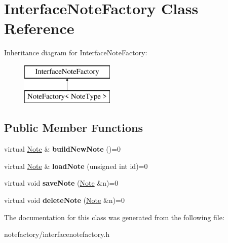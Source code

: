\hypertarget{class_interface_note_factory}{\section{Interface\-Note\-Factory Class Reference}
\label{class_interface_note_factory}
}
Inheritance diagram for Interface\-Note\-Factory\-:\begin{figure}[H]
\begin{center}
\leavevmode
\includegraphics[height=2.000000cm]{class_interface_note_factory}
\end{center}
\end{figure}
\subsection*{Public Member Functions}
\begin{DoxyCompactItemize}
\item 
\hypertarget{class_interface_note_factory_ae2084ccfb27a9c0fe6a0a6dbfb3a4e7b}{virtual \hyperlink{class_note}{Note} \& {\bfseries build\-New\-Note} ()=0}\label{class_interface_note_factory_ae2084ccfb27a9c0fe6a0a6dbfb3a4e7b}

\item 
\hypertarget{class_interface_note_factory_a39d4278feb13f8ea452b9eef0bb302a5}{virtual \hyperlink{class_note}{Note} \& {\bfseries load\-Note} (unsigned int id)=0}\label{class_interface_note_factory_a39d4278feb13f8ea452b9eef0bb302a5}

\item 
\hypertarget{class_interface_note_factory_a5eaa49c05be1a48e71de83b71b89eac8}{virtual void {\bfseries save\-Note} (\hyperlink{class_note}{Note} \&n)=0}\label{class_interface_note_factory_a5eaa49c05be1a48e71de83b71b89eac8}

\item 
\hypertarget{class_interface_note_factory_a31218ce86e383c0aad3601e318a29a69}{virtual void {\bfseries delete\-Note} (\hyperlink{class_note}{Note} \&n)=0}\label{class_interface_note_factory_a31218ce86e383c0aad3601e318a29a69}

\end{DoxyCompactItemize}


The documentation for this class was generated from the following file\-:\begin{DoxyCompactItemize}
\item 
notefactory/interfacenotefactory.\-h\end{DoxyCompactItemize}
